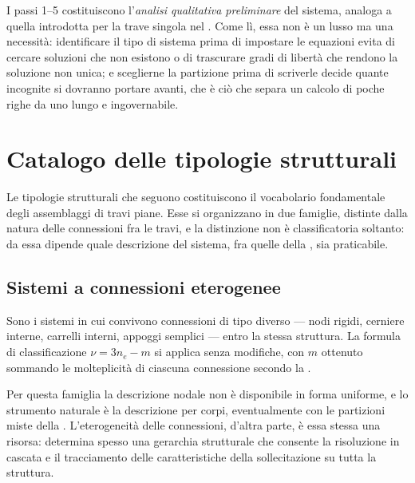\begin{oss}
	I passi 1--5 costituiscono l'\emph{analisi
		qualitativa preliminare} del sistema, analoga
	a quella introdotta per la trave singola nel
	. Come lì, essa non è
	un lusso ma una necessità: identificare il tipo
	di sistema prima di impostare le equazioni evita
	di cercare soluzioni che non esistono o di
	trascurare gradi di libertà che rendono la
	soluzione non unica; e sceglierne la partizione
	prima di scriverle decide quante incognite si
	dovranno portare avanti, che è ciò che separa un
	calcolo di poche righe da uno lungo e ingovernabile.
\end{oss}


\section{Catalogo delle tipologie strutturali}
\label{sec:catalogo}

Le tipologie strutturali che seguono costituiscono il
vocabolario fondamentale degli assemblaggi di travi piane.
Esse si organizzano in due famiglie, distinte dalla natura
delle connessioni fra le travi, e la distinzione non è
classificatoria soltanto: da essa dipende quale descrizione
del sistema, fra quelle della
, sia praticabile.


\subsection{Sistemi a connessioni eterogenee}
\label{subsec:cat_eterogenee}

Sono i sistemi in cui convivono connessioni di tipo diverso
--- nodi rigidi, cerniere interne, carrelli interni, appoggi
semplici --- entro la stessa struttura. La formula di
classificazione $\nu = 3n_e - m$ si applica senza modifiche,
con $m$ ottenuto sommando le molteplicità di ciascuna
connessione secondo la .

Per questa famiglia la descrizione nodale non è disponibile
in forma uniforme, e lo strumento naturale è la descrizione
per corpi, eventualmente con le partizioni miste della
. L'eterogeneità delle connessioni,
d'altra parte, è essa stessa una risorsa: determina spesso
una gerarchia strutturale che consente la risoluzione in
cascata e il tracciamento delle caratteristiche della
sollecitazione su tutta la struttura.


